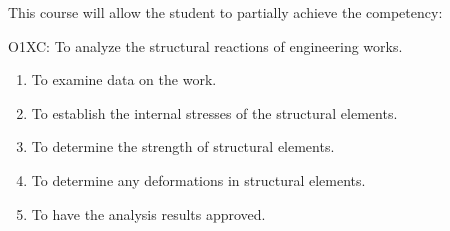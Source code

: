 {This course will allow the student to partially achieve the competency:

O1XC:  To analyze the structural reactions of engineering works.
\begin{enumerate}
\item To examine data on the work.
\item To establish the internal stresses of the structural elements.
\item To determine the strength of structural elements.
\item To determine any deformations in structural elements.
\item To have the analysis results approved.
\end{enumerate}
}
